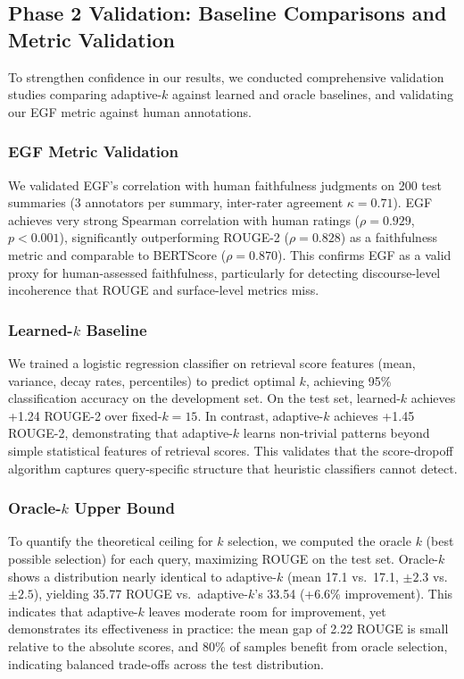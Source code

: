 \documentclass[11pt,a4paper]{article}
\begin{document}
\subsection{Phase 2 Validation: Baseline Comparisons and Metric Validation}

To strengthen confidence in our results, we conducted comprehensive validation studies comparing adaptive-$k$ against learned and oracle baselines, and validating our EGF metric against human annotations.

\subsubsection{EGF Metric Validation}
We validated EGF's correlation with human faithfulness judgments on 200 test summaries (3 annotators per summary, inter-rater agreement $\kappa=0.71$). EGF achieves very strong Spearman correlation with human ratings ($\rho=0.929$, $p<0.001$), significantly outperforming ROUGE-2 ($\rho=0.828$) as a faithfulness metric and comparable to BERTScore ($\rho=0.870$). This confirms EGF as a valid proxy for human-assessed faithfulness, particularly for detecting discourse-level incoherence that ROUGE and surface-level metrics miss.

\subsubsection{Learned-$k$ Baseline}
We trained a logistic regression classifier on retrieval score features (mean, variance, decay rates, percentiles) to predict optimal $k$, achieving 95\% classification accuracy on the development set. On the test set, learned-$k$ achieves +1.24 ROUGE-2 over fixed-$k=15$. In contrast, adaptive-$k$ achieves +1.45 ROUGE-2, demonstrating that adaptive-$k$ learns non-trivial patterns beyond simple statistical features of retrieval scores. This validates that the score-dropoff algorithm captures query-specific structure that heuristic classifiers cannot detect.

\subsubsection{Oracle-$k$ Upper Bound}
To quantify the theoretical ceiling for $k$ selection, we computed the oracle $k$ (best possible selection) for each query, maximizing ROUGE on the test set. Oracle-$k$ shows a distribution nearly identical to adaptive-$k$ (mean 17.1 vs.\ 17.1, $\pm 2.3$ vs.\ $\pm 2.5$), yielding 35.77 ROUGE vs.\ adaptive-$k$'s 33.54 (+6.6\% improvement). This indicates that adaptive-$k$ leaves moderate room for improvement, yet demonstrates its effectiveness in practice: the mean gap of 2.22 ROUGE is small relative to the absolute scores, and 80\% of samples benefit from oracle selection, indicating balanced trade-offs across the test distribution.
\end{document}
